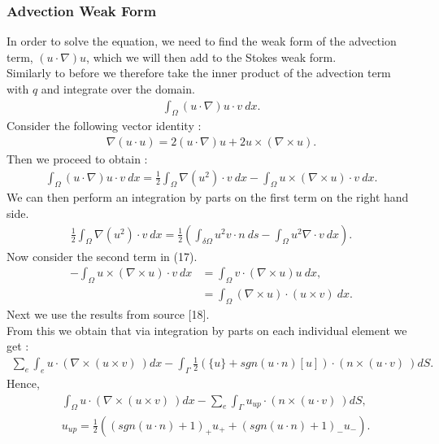 \documentclass[11pt,twoside,a4paper]{article}
\begin{document}
\subsubsection{Advection Weak Form}
In order to solve the equation, we need to find the weak form of the advection term, $(u \cdot \nabla) u$, which we will then add to the Stokes weak form.\\
Similarly to before we therefore take the inner product of the advection term with $q$ and integrate over the domain.
\begin{align}
\int_\Omega (u \cdot \nabla)u \cdot v \ dx .
\end{align}
Consider the following vector identity :
\begin{align*}
\nabla (u \cdot u) = 2 (u \cdot \nabla) u + 2 u \times (\nabla \times u) .
\end{align*}
Then we proceed to obtain :
\begin{align}
\int_\Omega (u \cdot \nabla)u \cdot v \ dx = \frac{1}{2} \int_\Omega \nabla (u^2) \cdot v \ dx - \int_{\Omega} u \times (\nabla \times u) \cdot v \ dx .
\end{align}
We can then perform an integration by parts on the first term on the right hand side.
\begin{align}
 \frac{1}{2} \int_\Omega \nabla (u^2) \cdot v \ dx = \frac{1}{2} (\int_{\delta \Omega } u^2 v \cdot n \ ds - \int_\Omega u^2 \nabla \cdot v \ dx) .
\end{align}
Now consider the second term in (17).
\begin{align*}
- \int_{\Omega} u \times (\nabla \times u) \cdot v \ dx &= \int_{\Omega} v \cdot (\nabla \times u) u \ dx,  \\
&=  \int_{\Omega} (\nabla \times u) \cdot (u \times v)  \ dx .
\end{align*}
Next we use the results from source [18].\\
From this we obtain that via integration by parts on each individual element we get :
\begin{align*}
\sum_e \int_e u \cdot (\nabla \times (u \times v) \ ) dx - \int_{\Gamma} \frac{1}{2}(\{u\} + sgn(u \cdot n)[u]) \cdot (n \times (u \cdot v) \ ) dS .
\end{align*}
Hence,
\begin{align}
&\int_\Omega u \cdot (\nabla \times (u \times v) \ ) dx -  \sum_e \int_{\Gamma} u_{up} \cdot (n \times (u \cdot v) \ ) dS, \\
& u_{up} = \frac{1}{2}((sgn(u \cdot n) + 1)_+ u_+ + (sgn (u \cdot n) +1)_- u_-) .
\end{align}
\end{document}
